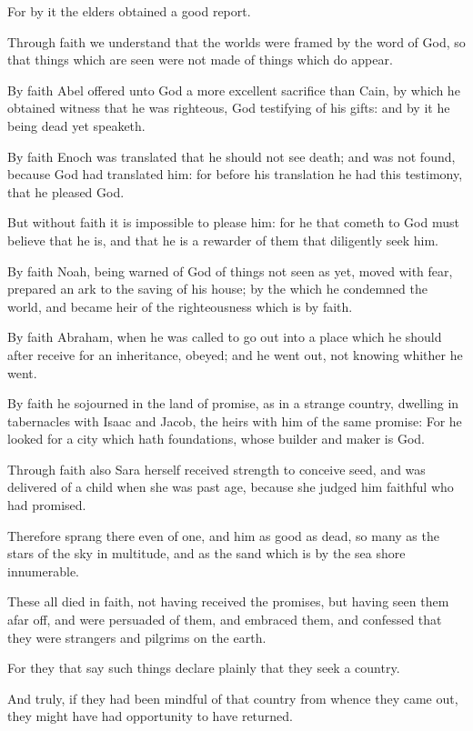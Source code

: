 \Verse For by it the elders obtained a good report.

\Verse Through faith we understand that the worlds were framed by the word of God, so that things which are seen were not made of things which do appear.

\Verse By faith Abel offered unto God a more excellent sacrifice than Cain, by which he obtained witness that he was righteous, God testifying of his gifts: and by it he being dead yet speaketh.

\Verse By faith Enoch was translated that he should not see death; and was not found, because God had translated him: for before his translation he had this testimony, that he pleased God.

\Verse But without faith it is impossible to please him: for he that cometh to God must believe that he is, and that he is a rewarder of them that diligently seek him.

\Verse By faith Noah, being warned of God of things not seen as yet, moved with fear, prepared an ark to the saving of his house; by the which he condemned the world, and became heir of the righteousness which is by faith.

\Verse By faith Abraham, when he was called to go out into a place which he should after receive for an inheritance, obeyed; and he went out, not knowing whither he went.

\Verse By faith he sojourned in the land of promise, as in a strange country, dwelling in tabernacles with Isaac and Jacob, the heirs with him of the same promise: \Verse For he looked for a city which hath foundations, whose builder and maker is God.

\Verse Through faith also Sara herself received strength to conceive seed, and was delivered of a child when she was past age, because she judged him faithful who had promised.

\Verse Therefore sprang there even of one, and him as good as dead, so many as the stars of the sky in multitude, and as the sand which is by the sea shore innumerable.

\Verse These all died in faith, not having received the promises, but having seen them afar off, and were persuaded of them, and embraced them, and confessed that they were strangers and pilgrims on the earth.

\Verse For they that say such things declare plainly that they seek a country.

\Verse And truly, if they had been mindful of that country from whence they came out, they might have had opportunity to have returned.

